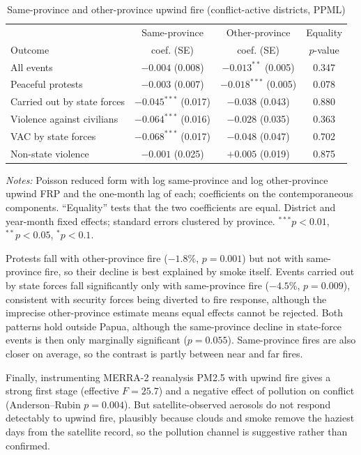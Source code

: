 \documentclass[12pt]{article}
\begin{document}
\begin{table}[H]
\centering
\caption{Same-province and other-province upwind fire (conflict-active districts, PPML)}
\label{tab:province}
\footnotesize
\begin{tabular}{lccc}
\toprule
 & Same-province & Other-province & Equality \\
Outcome & coef. (SE) & coef. (SE) & $p$-value \\
\midrule
All events & $-0.004$ (0.008) & $-0.013^{**}$ (0.005) & 0.347 \\
Peaceful protests & $-0.003$ (0.007) & $-0.018^{***}$ (0.005) & 0.078 \\
Carried out by state forces & $-0.045^{***}$ (0.017) & $-0.038$ (0.043) & 0.880 \\
Violence against civilians & $-0.064^{***}$ (0.016) & $-0.028$ (0.035) & 0.363 \\
VAC by state forces & $-0.068^{***}$ (0.017) & $-0.048$ (0.047) & 0.702 \\
Non-state violence & $-0.001$ (0.025) & $+0.005$ (0.019) & 0.875 \\
\bottomrule
\end{tabular}
\begin{minipage}{0.95\textwidth}
\vspace{4pt}
\footnotesize \emph{Notes:} Poisson reduced form with log same-province and log other-province upwind FRP and the one-month lag of each; coefficients on the contemporaneous components. ``Equality'' tests that the two coefficients are equal. District and year-month fixed effects; standard errors clustered by province. $^{***}p<0.01$, $^{**}p<0.05$, $^{*}p<0.1$.
\end{minipage}
\end{table}

Protests fall with other-province fire ($-1.8\%$, $p=0.001$) but not with same-province fire, so their decline is best explained by smoke itself. Events carried out by state forces fall significantly only with same-province fire ($-4.5\%$, $p=0.009$), consistent with security forces being diverted to fire response, although the imprecise other-province estimate means equal effects cannot be rejected. Both patterns hold outside Papua, although the same-province decline in state-force events is then only marginally significant ($p=0.055$). Same-province fires are also closer on average, so the contrast is partly between near and far fires.

Finally, instrumenting MERRA-2 reanalysis PM2.5 \citep{gelaro2017merra} with upwind fire gives a strong first stage (effective $F=25.7$) and a negative effect of pollution on conflict (Anderson--Rubin $p=0.004$). But satellite-observed aerosols do not respond detectably to upwind fire, plausibly because clouds and smoke remove the haziest days from the satellite record, so the pollution channel is suggestive rather than confirmed.
\end{document}
